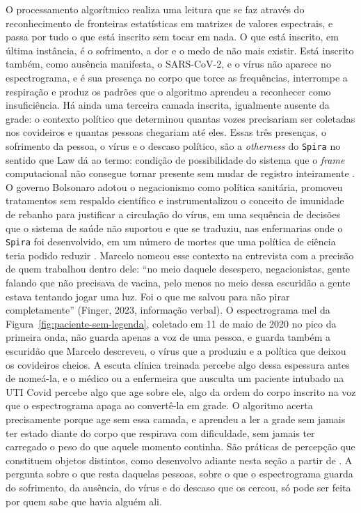 O processamento algorítmico realiza uma leitura que se faz através do reconhecimento de fronteiras estatísticas em matrizes de valores espectrais, e passa por tudo o que está inscrito sem tocar em nada. O que está inscrito, em última instância, é o sofrimento, a dor e o medo de não mais existir. Está inscrito também, como ausência manifesta, o SARS-CoV-2, e o vírus não aparece no espectrograma, e é sua presença no corpo que torce as frequências, interrompe a respiração e produz os padrões que o algoritmo aprendeu a reconhecer como insuficiência. Há ainda uma terceira camada inscrita, igualmente ausente da grade: o contexto político que determinou quantas vozes precisariam ser coletadas nos covideiros e quantas pessoas chegariam até eles. Essas três presenças, o sofrimento da pessoa, o vírus e o descaso político, são a \textit{otherness} do \texttt{Spira} no sentido que Law dá ao termo: condição de possibilidade do sistema que o \textit{frame} computacional não consegue tornar presente sem mudar de registro inteiramente \parencite[pp.~83--85]{Law2004After}. O governo Bolsonaro adotou o negacionismo como política sanitária, promoveu tratamentos sem respaldo científico e instrumentalizou o conceito de imunidade de rebanho para justificar a circulação do vírus, em uma sequência de decisões que o sistema de saúde não suportou e que se traduziu, nas enfermarias onde o \texttt{Spira} foi desenvolvido, em um número de mortes que uma política de ciência teria podido reduzir \parencite{Sarturi2025Pandemia}. Marcelo nomeou esse contexto na entrevista com a precisão de quem trabalhou dentro dele: \enquote{no meio daquele desespero, negacionistas, gente falando que não precisava de vacina, pelo menos no meio dessa escuridão a gente estava tentando jogar uma luz. Foi o que me salvou para não pirar completamente} (Finger, 2023, informação verbal). O espectrograma mel da Figura~\ref{fig:paciente-sem-legenda}, coletado em 11 de maio de 2020 no pico da primeira onda, não guarda apenas a voz de uma pessoa, e guarda também a escuridão que Marcelo descreveu, o vírus que a produziu e a política que deixou os covideiros cheios. A escuta clínica treinada percebe algo dessa espessura antes de nomeá-la, e o médico ou a enfermeira que ausculta um paciente intubado na UTI Covid percebe algo que age sobre ele, algo da ordem do corpo inscrito na voz que o espectrograma apaga ao convertê-la em grade. O algoritmo acerta precisamente porque age sem essa camada, e aprendeu a ler a grade sem jamais ter estado diante do corpo que respirava com dificuldade, sem jamais ter carregado o peso do que aquele momento continha. São práticas de percepção que constituem objetos distintos, como desenvolvo adiante nesta seção a partir de \textcite{mol2002body}. A pergunta sobre o que resta daquelas pessoas, sobre o que o espectrograma guarda do sofrimento, da ausência, do vírus e do descaso que os cercou, só pode ser feita por quem sabe que havia alguém ali.

